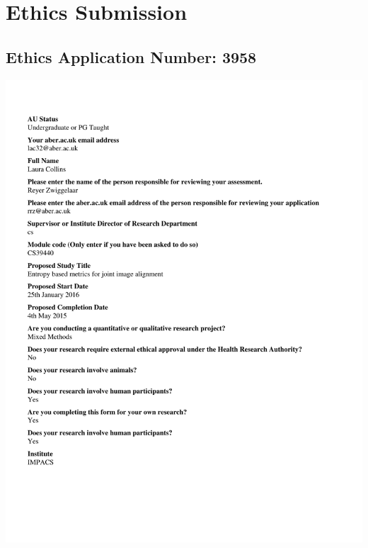 \chapter{Ethics Submission}


\section{Ethics Application Number: 3958}

  \includegraphics[scale = 0.7,clip,trim=10mm 25mm 25mm 18mm]{Appendix2/3958.pdf}
  
